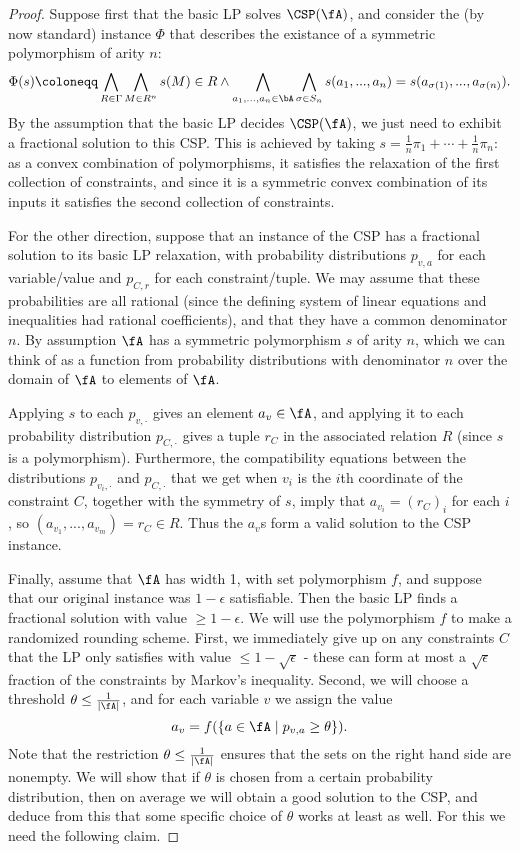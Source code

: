 \begin{proof} Suppose first that the basic LP solves $\CSP(\fA)$, and consider the (by now standard) instance $\Phi$ that describes the existance of a symmetric polymorphism of arity $n$:
\[
\Phi(s) \coloneqq \bigwedge_{R \in \Gamma} \bigwedge_{M \in R^n} s(M) \in R \wedge \bigwedge_{a_1, ..., a_n \in \bA} \bigwedge_{\sigma \in S_n} s(a_1, ..., a_n) = s(a_{\sigma(1)}, ..., a_{\sigma(n)}).
\]
By the assumption that the basic LP decides $\CSP(\fA)$, we just need to exhibit a fractional solution to this CSP. This is achieved by taking $s = \frac{1}{n}\pi_1 + \cdots + \frac{1}{n}\pi_n$: as a convex combination of polymorphisms, it satisfies the relaxation of the first collection of constraints, and since it is a symmetric convex combination of its inputs it satisfies the second collection of constraints.

For the other direction, suppose that an instance of the CSP has a fractional solution to its basic LP relaxation, with probability distributions $p_{v,a}$ for each variable/value and $p_{C,r}$ for each constraint/tuple. We may assume that these probabilities are all rational (since the defining system of linear equations and inequalities had rational coefficients), and that they have a common denominator $n$. By assumption $\fA$ has a symmetric polymorphism $s$ of arity $n$, which we can think of as a function from probability distributions with denominator $n$ over the domain of $\fA$ to elements of $\fA$.

Applying $s$ to each $p_{v,\cdot}$ gives an element $a_v \in \fA$, and applying it to each probability distribution $p_{C,\cdot}$ gives a tuple $r_C$ in the associated relation $R$ (since $s$ is a polymorphism). Furthermore, the compatibility equations between the distributions $p_{v_i,\cdot}$ and $p_{C,\cdot}$ that we get when $v_i$ is the $i$th coordinate of the constraint $C$, together with the symmetry of $s$, imply that $a_{v_i} = (r_C)_i$ for each $i$, so $(a_{v_1}, ..., a_{v_m}) = r_C \in R$. Thus the $a_v$s form a valid solution to the CSP instance.

Finally, assume that $\fA$ has width 1, with set polymorphism $f$, and suppose that our original instance was $1-\epsilon$ satisfiable. Then the basic LP finds a fractional solution with value $\ge 1 - \epsilon$. We will use the polymorphism $f$ to make a randomized rounding scheme. First, we immediately give up on any constraints $C$ that the LP only satisfies with value $\le 1 - \sqrt{\epsilon}$ - these can form at most a $\sqrt{\epsilon}$ fraction of the constraints by Markov's inequality. Second, we will choose a threshold $\theta \le \frac{1}{|\fA|}$, and for each variable $v$ we assign the value
\[
a_v = f(\{a \in \fA \mid p_{v,a} \ge \theta\}).
\]
Note that the restriction $\theta \le \frac{1}{|\fA|}$ ensures that the sets on the right hand side are nonempty. We will show that if $\theta$ is chosen from a certain probability distribution, then on average we will obtain a good solution to the CSP, and deduce from this that some specific choice of $\theta$ works at least as well. For this we need the following claim.


\end{proof}
